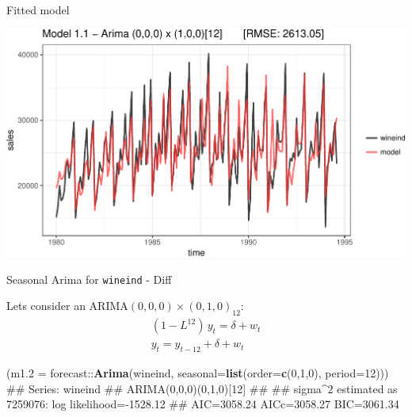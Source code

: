 \documentclass[11pt,ignorenonframetext,]{beamer}
\newenvironment{Shaded}{}{}
\newcommand{\DataTypeTok}[1]{\textcolor[rgb]{0.56,0.13,0.00}{#1}}
\newcommand{\DecValTok}[1]{\textcolor[rgb]{0.25,0.63,0.44}{#1}}
\newcommand{\KeywordTok}[1]{\textcolor[rgb]{0.00,0.44,0.13}{\textbf{#1}}}
\newcommand{\NormalTok}[1]{#1}
\newcommand{\OperatorTok}[1]{\textcolor[rgb]{0.40,0.40,0.40}{#1}}
\let\oldShaded\Shaded
\let\endoldShaded\endShaded
\renewenvironment{Shaded}{\footnotesize\begin{spacing}{0.9}\oldShaded}{\endoldShaded\end{spacing}}
\begin{document}
\begin{frame}{%
\protect\hypertarget{fitted-model}{%
Fitted model}}

\begin{center}\includegraphics[width=\textwidth]{Lec11_files/figure-beamer/unnamed-chunk-4-1} \end{center}

\end{frame}

\begin{frame}[fragile]{%
\protect\hypertarget{seasonal-arima-for---diff}{%
Seasonal Arima for \texttt{wineind} - Diff}}

Lets consider an \(\text{ARIMA}(0,0,0) \times (0,1,0)_{12}\): \[
\begin{aligned}
(1 - L^{12}) \, y_t = \delta + w_t \\
y_t = y_{t-12} + \delta + w_t
\end{aligned}
\] \vspace{2mm}

\begin{Shaded}
\begin{Highlighting}[]
\NormalTok{(}\DataTypeTok{m1.2 =}\NormalTok{ forecast}\OperatorTok{::}\KeywordTok{Arima}\NormalTok{(wineind, }\DataTypeTok{seasonal=}\KeywordTok{list}\NormalTok{(}\DataTypeTok{order=}\KeywordTok{c}\NormalTok{(}\DecValTok{0}\NormalTok{,}\DecValTok{1}\NormalTok{,}\DecValTok{0}\NormalTok{), }\DataTypeTok{period=}\DecValTok{12}\NormalTok{)))}
\NormalTok{## Series: wineind }
\NormalTok{## ARIMA(0,0,0)(0,1,0)[12] }
\NormalTok{## }
\NormalTok{## sigma^2 estimated as 7259076:  log likelihood=-1528.12}
\NormalTok{## AIC=3058.24   AICc=3058.27   BIC=3061.34}
\end{Highlighting}
\end{Shaded}

\end{frame}
\end{document}
